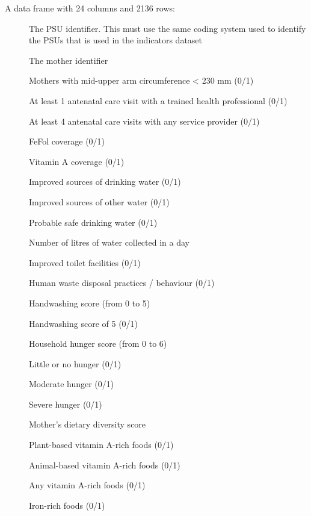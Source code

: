 \documentclass[a4paper]{book}
\begin{document}
\begin{Format}
A data frame with 24 columns and 2136 rows:
\begin{description}

\item[] The PSU identifier. This must use the same coding system
used to identify the PSUs that is used in the indicators dataset
\item[] The mother identifier
\item[] Mothers with mid-upper arm circumference < 230 mm (0/1)
\item[] At least 1 antenatal care visit with a trained health
professional (0/1)
\item[] At least 4 antenatal care visits with any service
provider (0/1)
\item[] FeFol coverage (0/1)
\item[] Vitamin A coverage (0/1)
\item[] Improved sources of drinking water (0/1)
\item[] Improved sources of other water (0/1)
\item[] Probable safe drinking water (0/1)
\item[] Number of litres of water collected in a day
\item[] Improved toilet facilities (0/1)
\item[] Human waste disposal practices / behaviour (0/1)
\item[] Handwashing score (from 0 to 5)
\item[] Handwashing score of 5 (0/1)
\item[] Household hunger score (from 0 to 6)
\item[] Little or no hunger (0/1)
\item[] Moderate hunger (0/1)
\item[] Severe hunger (0/1)
\item[] Mother's dietary diversity score
\item[] Plant-based vitamin A-rich foods (0/1)
\item[] Animal-based vitamin A-rich foods (0/1)
\item[] Any vitamin A-rich foods (0/1)
\item[] Iron-rich foods (0/1)

\end{description}
\end{Format}
\end{document}
